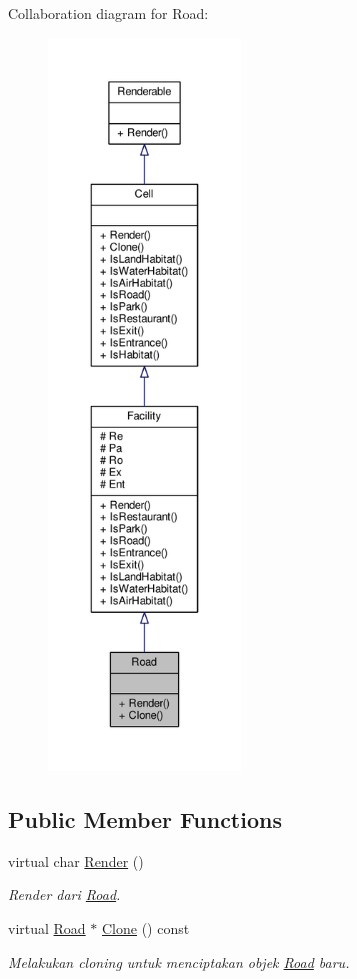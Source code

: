 Collaboration diagram for Road\+:
\nopagebreak
\begin{figure}[H]
\begin{center}
\leavevmode
\includegraphics[height=550pt]{classRoad__coll__graph}
\end{center}
\end{figure}
\subsection*{Public Member Functions}
\begin{DoxyCompactItemize}
\item 
virtual char \hyperlink{classRoad_a72268486a71718b5b7957b63ecd565bc}{Render} ()
\begin{DoxyCompactList}\small\item\em Render dari \hyperlink{classRoad}{Road}. \end{DoxyCompactList}\item 
virtual \hyperlink{classRoad}{Road} $\ast$ \hyperlink{classRoad_a23ca807031dc27cb76d16a808e08beb7}{Clone} () const 
\begin{DoxyCompactList}\small\item\em Melakukan cloning untuk menciptakan objek \hyperlink{classRoad}{Road} baru. \end{DoxyCompactList}\end{DoxyCompactItemize}
